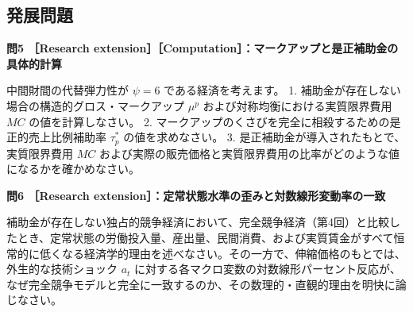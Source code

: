 \documentclass[
  japanese,
  lualatex,
  ja=standard,
  12pt,
  a4paper]{ltjsarticle}
\begin{document}
\subsection{発展問題}\label{ux767aux5c55ux554fux984c}

\textbf{問5 ［Research
extension］［Computation］：マークアップと是正補助金の具体的計算}

中間財間の代替弾力性が \(\psi = 6\) である経済を考えます。 1.
補助金が存在しない場合の構造的グロス・マークアップ \(\mu^p\)
および対称均衡における実質限界費用 \(MC\) の値を計算しなさい。 2.
マークアップのくさびを完全に相殺するための是正的売上比例補助率
\(\tau_p^*\) の値を求めなさい。 3.
是正補助金が導入されたもとで、実質限界費用 \(MC\)
および実際の販売価格と実質限界費用の比率がどのような値になるかを確かめなさい。

\textbf{問6 ［Research
extension］：定常状態水準の歪みと対数線形変動率の一致}

補助金が存在しない独占的競争経済において、完全競争経済（第4回）と比較したとき、定常状態の労働投入量、産出量、民間消費、および実質賃金がすべて恒常的に低くなる経済学的理由を述べなさい。その一方で、伸縮価格のもとでは、外生的な技術ショック
\(a_t\)
に対する各マクロ変数の対数線形パーセント反応が、なぜ完全競争モデルと完全に一致するのか、その数理的・直観的理由を明快に論じなさい。
\end{document}
